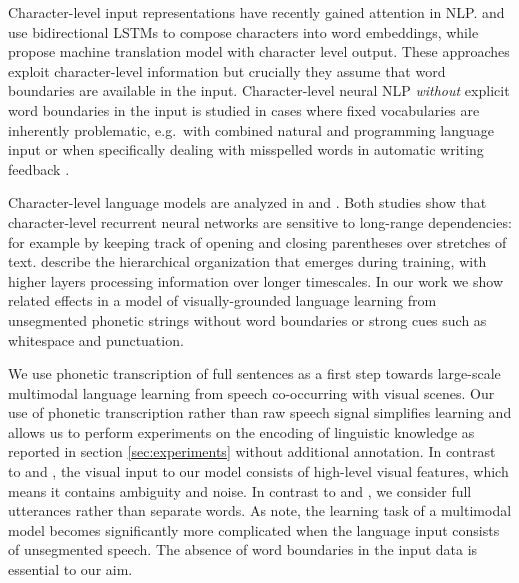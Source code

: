Character-level input representations have recently gained attention
in NLP.  and
 use bidirectional LSTMs to compose
characters into word embeddings, while
 propose machine translation model with 
character level output. These approaches exploit character-level
information but crucially they assume that word boundaries are available
in the input.
Character-level neural NLP \textit{without} explicit word boundaries in the input is studied in cases where fixed vocabularies are inherently problematic, e.g.\ with combined natural and programming language input \cite{chrupala2013text} or when specifically dealing with misspelled words in automatic writing feedback \cite{xie2016neural}. 

Character-level language models are analyzed in
 and
. Both studies show that
character-level recurrent neural networks are sensitive to
long-range dependencies: for example by keeping track of opening and
closing parentheses over stretches of
text.  describe the hierarchical
organization that emerges during training, with higher layers
processing information over longer timescales. In our work we show
related effects in a model of visually-grounded
language learning from unsegmented phonetic strings without word
boundaries or strong cues such as whitespace and punctuation.

We use phonetic transcription of full sentences as a first step
towards large-scale multimodal language learning from speech
co-occurring with visual scenes. 
Our use of phonetic
transcription rather than raw speech signal simplifies learning
and allows us to perform experiments on the encoding of linguistic
knowledge as reported in section \ref{sec:experiments} without
additional annotation. 
In contrast to 
and , the visual input to our model consists
of high-level visual features, which means it contains ambiguity and
noise. In contrast to  and
, we consider full utterances rather than
separate words. As  note, the learning task
of a multimodal model becomes significantly more complicated when the
language input consists of unsegmented speech. The absence of word
boundaries in the input data is essential to our aim. 

